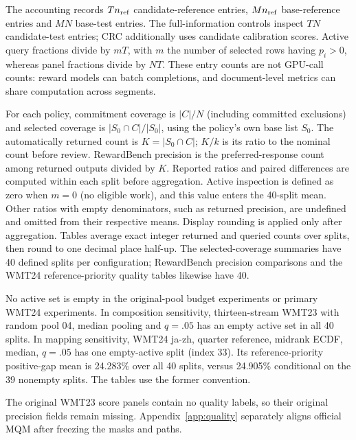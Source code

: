 The accounting records $Tn_{\rm ref}$ candidate-reference entries, $Mn_{\rm ref}$ base-reference entries and $MN$ base-test entries. The full-information controls inspect $TN$ candidate-test entries; CRC additionally uses candidate calibration scores. Active query fractions divide by $mT$, with $m$ the number of selected rows having $p_i>0$, whereas panel fractions divide by $NT$. These entry counts are not GPU-call counts: reward models can batch completions, and document-level metrics can share computation across segments.

For each policy, commitment coverage is $|C|/N$ (including committed exclusions) and selected coverage is $|S_0\cap C|/|S_0|$, using the policy's own base list $S_0$. The automatically returned count is $K=|S_0\cap C|$; $K/k$ is its ratio to the nominal count before review. RewardBench precision is the preferred-response count among returned outputs divided by $K$. Reported ratios and paired differences are computed within each split before aggregation. Active inspection is defined as zero when $m=0$ (no eligible work), and this value enters the 40-split mean. Other ratios with empty denominators, such as returned precision, are undefined and omitted from their respective means. Display rounding is applied only after aggregation. Tables average exact integer returned and queried counts over splits, then round to one decimal place half-up. The selected-coverage summaries have 40 defined splits per configuration; RewardBench precision comparisons and the WMT24 reference-priority quality tables likewise have 40.

No active set is empty in the original-pool budget experiments or primary WMT24 experiments. In composition sensitivity, thirteen-stream WMT23 with random pool 04, median pooling and $q=.05$ has an empty active set in all 40 splits. In mapping sensitivity, WMT24 ja-zh, quarter reference, midrank ECDF, median, $q=.05$ has one empty-active split (index 33). Its reference-priority positive-gap mean is 24.283\% over all 40 splits, versus 24.905\% conditional on the 39 nonempty splits. The tables use the former convention. 

The original WMT23 score panels contain no quality labels, so their original precision fields remain missing. Appendix~\ref{app:quality} separately aligns official MQM after freezing the masks and paths.


